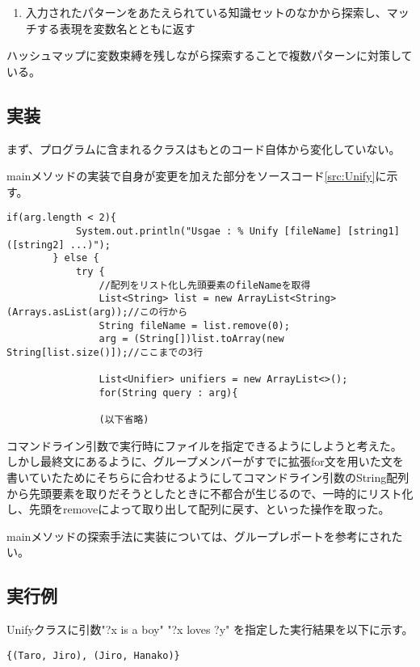 \documentclass[a4j]{jarticle}
\begin{document}
\begin{enumerate}
\item 入力されたパターンをあたえられている知識セットのなかから探索し、マッチする表現を変数名とともに返す
\end{enumerate}

ハッシュマップに変数束縛を残しながら探索することで複数パターンに対策している。

\subsection{実装}

まず、プログラムに含まれるクラスはもとのコード自体から変化していない。

 mainメソッドの実装で自身が変更を加えた部分をソースコード\ref{src:Unify}に示す。

\begin{lstlisting}[caption=Unifyメソッド,label=src:Unify]
        if(arg.length < 2){
            System.out.println("Usgae : % Unify [fileName] [string1] ([string2] ...)");
        } else {
            try {
            	//配列をリスト化し先頭要素のfileNameを取得
                List<String> list = new ArrayList<String>(Arrays.asList(arg));//この行から
                String fileName = list.remove(0);
                arg = (String[])list.toArray(new String[list.size()]);//ここまでの3行

                List<Unifier> unifiers = new ArrayList<>();
                for(String query : arg){

                (以下省略)
\end{lstlisting}

コマンドライン引数で実行時にファイルを指定できるようにしようと考えた。
しかし最終文にあるように、グループメンバーがすでに拡張for文を用いた文を書いていたためにそちらに合わせるようにしてコマンドライン引数のString配列から先頭要素を取りだそうとしたときに不都合が生じるので、一時的にリスト化し、先頭をremoveによって取り出して配列に戻す、といった操作を取った。

mainメソッドの探索手法に実装については、グループレポートを参考にされたい。



\subsection{実行例}
Unifyクラスに引数"?x is a boy" "?x loves ?y" を指定した実行結果を以下に示す。

\begin{lstlisting}
{(Taro, Jiro), (Jiro, Hanako)}

\end{lstlisting}
\end{document}
